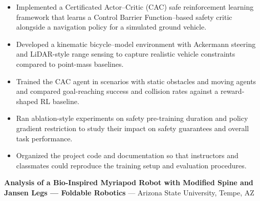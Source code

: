 \documentclass[11pt]{article}
\begin{document}
\begin{itemize}[leftmargin=*,noitemsep]
  
  \item Implemented a Certificated Actor–Critic (CAC) safe reinforcement learning framework that learns a Control Barrier Function–based safety critic alongside a navigation policy for a simulated ground vehicle.
  
  \item Developed a kinematic bicycle–model environment with Ackermann steering and LiDAR-style range sensing to capture realistic vehicle constraints compared to point-mass baselines.
  
  \item Trained the CAC agent in scenarios with static obstacles and moving agents and compared goal-reaching success and collision rates against a reward-shaped RL baseline.
  
  \item Ran ablation-style experiments on safety pre-training duration and policy gradient restriction to study their impact on safety guarantees and overall task performance.
  
  \item Organized the project code and documentation so that instructors and classmates could reproduce the training setup and evaluation procedures.
  
\end{itemize}


\vspace{2pt}

\textbf{ Analysis of a Bio-Inspired Myriapod Robot with Modified Spine and Jansen Legs — Foldable Robotics } --- Arizona State University, Tempe, AZ\\
\end{document}
